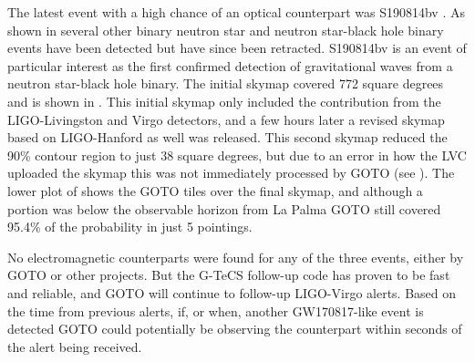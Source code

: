 \begin{colsection}
The latest event with a high chance of an optical counterpart was S190814bv \citep{S190814bv}. As shown in  several other binary neutron star and neutron star-black hole binary events have been detected but have since been retracted. S190814bv is an event of particular interest as the first confirmed detection of gravitational waves from a neutron star-black hole binary. The initial skymap covered 772 square degrees and is shown in . This initial skymap only included the contribution from the LIGO-Livingston and Virgo detectors, and a few hours later a revised skymap based on LIGO-Hanford as well was released. This second skymap reduced the 90\% contour region to just 38 square degrees, but due to an error in how the LVC uploaded the skymap this was not immediately processed by GOTO (see ). The lower plot of  shows the GOTO tiles over the final skymap, and although a portion was below the observable horizon from La Palma GOTO still covered 95.4\% of the probability in just 5 pointings.

No electromagnetic counterparts were found for any of the three events, either by GOTO or other projects. But the G-TeCS follow-up code has proven to be fast and reliable, and GOTO will continue to follow-up LIGO-Virgo alerts. Based on the time from previous alerts, if, or when, another GW170817-like event is detected GOTO could potentially be observing the counterpart within seconds of the alert being received.

\newpage

\makeatletter
\setlength{\@fptop}{0pt}
\makeatother


\end{colsection}
